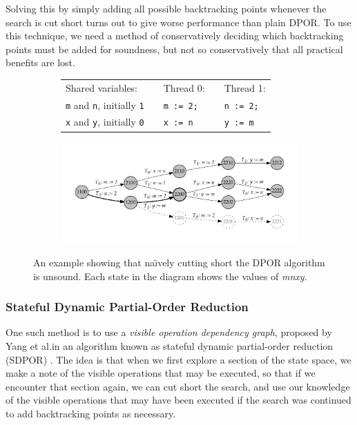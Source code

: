 \documentclass[12pt,a4paper,twoside,openright]{report}
\begin{document}
Solving this by simply adding
all possible backtracking points
whenever the search is cut short turns out to
give worse performance than plain DPOR.
To use this technique,
we need a method of conservatively deciding which
backtracking points must be added for soundness, but not
so conservatively that all practical benefits are lost.

\begin{figure}
	\begin{subfigure}{\textwidth}
		\begin{tabular}{lp{1cm}lp{0cm}l}
		Shared variables: &&Thread 0: &&Thread 1: \\
		\qquad \texttt{m} and \texttt{n}, initially \texttt{1}
			&&\qquad\texttt{m := 2;}
			&& \qquad\texttt{n := 2;} \\
		\qquad \texttt{x} and \texttt{y}, initially \texttt{0}
			&&\qquad\texttt{x := n}
			&& \qquad\texttt{y := m}
		\end{tabular}
	\end{subfigure}
	\begin{subfigure}{\textwidth}
		\includegraphics[width=\textwidth]{sdpor}
	\end{subfigure}
	\caption[An example illustrating the need for the
		Stateful DPOR algorithm.]
		{An example showing that na\"{\i}vely
		cutting short the DPOR algorithm is
		unsound. Each state in the diagram shows
	the values of \textit{mnxy}.}
	\label{fig:sdpor-motivation}
\end{figure}

\subsubsection{Stateful Dynamic Partial-Order Reduction}

One such method is to use a \emph{visible operation dependency
graph}, proposed by Yang et al.\@ in an
algorithm known as stateful dynamic
partial-order reduction (SDPOR) \cite{yang08}.
The idea is that when we first explore
a section of the state space,
we make a note of the visible operations
that may be executed, so that if we encounter that section again,
we can cut short the search, and use our knowledge of the
visible operations that may have been
executed if the search was continued
to add backtracking points as necessary.
\end{document}
